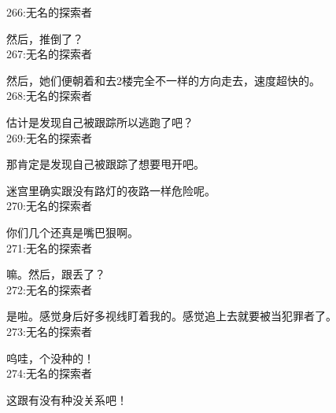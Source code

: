 266:无名的探索者

然后，推倒了？\\

267:无名的探索者

然后，她们便朝着和去2楼完全不一样的方向走去，速度超快的。\\

268:无名的探索者

估计是发现自己被跟踪所以逃跑了吧？\\

269:无名的探索者

那肯定是发现自己被跟踪了想要甩开吧。

迷宫里确实跟没有路灯的夜路一样危险呢。\\

270:无名的探索者

你们几个还真是嘴巴狠啊。\\

271:无名的探索者

嘛。然后，跟丢了？\\

272:无名的探索者

是啦。感觉身后好多视线盯着我的。感觉追上去就要被当犯罪者了。\\

273:无名的探索者

呜哇，个没种的！\\

274:无名的探索者

这跟有没有种没关系吧！\\

